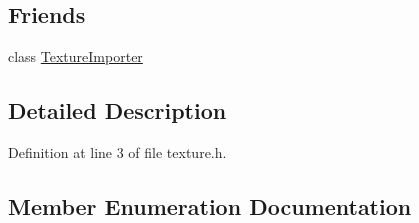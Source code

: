 \subsection*{Friends}
\begin{DoxyCompactItemize}
\item 
class \hyperlink{class_raw_texture_a72d3411e09812d0e365245420a64c3ec}{Texture\+Importer}
\end{DoxyCompactItemize}


\subsection{Detailed Description}


Definition at line 3 of file texture.\+h.



\subsection{Member Enumeration Documentation}
\hypertarget{class_raw_texture_ac0eafe7206f7f38aeb4e8e5631480f6d}{}
